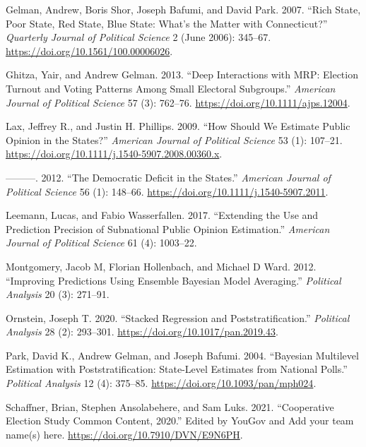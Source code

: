 \documentclass[
]{article}
\newlength{\cslhangindent}
\newlength{\cslentryspacingunit} %
\newenvironment{CSLReferences}[2] %
 {%
  \setlength{\parindent}{0pt}
  \ifodd #1
  \let\oldpar\par
  \def\par{\hangindent=\cslhangindent\oldpar}
  \fi
  \setlength{\parskip}{#2\cslentryspacingunit}
 }%
 {}
\begin{document}
\begin{CSLReferences}{1}{0}
\leavevmode{}%
Gelman, Andrew, Boris Shor, Joseph Bafumi, and David Park. 2007. {``Rich
State, Poor State, Red State, Blue State: What's the Matter with
Connecticut?''} \emph{Quarterly Journal of Political Science} 2 (June
2006): 345--67. \url{https://doi.org/10.1561/100.00006026}.

\leavevmode{}%
Ghitza, Yair, and Andrew Gelman. 2013. {``Deep Interactions with MRP:
Election Turnout and Voting Patterns Among Small Electoral Subgroups.''}
\emph{American Journal of Political Science} 57 (3): 762--76.
\url{https://doi.org/10.1111/ajps.12004}.

\leavevmode{}%
Lax, Jeffrey R., and Justin H. Phillips. 2009. {``How Should We Estimate
Public Opinion in the States?''} \emph{American Journal of Political
Science} 53 (1): 107--21.
\url{https://doi.org/10.1111/j.1540-5907.2008.00360.x}.

\leavevmode{}%
---------. 2012. {``The Democratic Deficit in the States.''}
\emph{American Journal of Political Science} 56 (1): 148--66.
\url{https://doi.org/10.1111/j.1540-5907.2011}.

\leavevmode{}%
Leemann, Lucas, and Fabio Wasserfallen. 2017. {``Extending the Use and
Prediction Precision of Subnational Public Opinion Estimation.''}
\emph{American Journal of Political Science} 61 (4): 1003--22.

\leavevmode{}%
Montgomery, Jacob M, Florian Hollenbach, and Michael D Ward. 2012.
{``Improving Predictions Using Ensemble Bayesian Model Averaging.''}
\emph{Political Analysis} 20 (3): 271--91.

\leavevmode{}%
Ornstein, Joseph T. 2020. {``Stacked Regression and
Poststratification.''} \emph{Political Analysis} 28 (2): 293--301.
\url{https://doi.org/10.1017/pan.2019.43}.

\leavevmode{}%
Park, David K., Andrew Gelman, and Joseph Bafumi. 2004. {``Bayesian
Multilevel Estimation with Poststratification: State-Level Estimates
from National Polls.''} \emph{Political Analysis} 12 (4): 375--85.
\url{https://doi.org/10.1093/pan/mph024}.

\leavevmode{}%
Schaffner, Brian, Stephen Ansolabehere, and Sam Luks. 2021.
{``Cooperative Election Study Common Content, 2020.''} Edited by YouGov
and Add your team name(s) here.
\url{https://doi.org/10.7910/DVN/E9N6PH}.


\end{CSLReferences}
\end{document}
